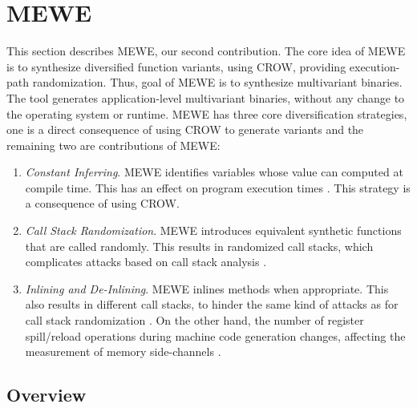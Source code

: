 \section{MEWE}
\label{section:mewe}

\newcommand{\tool}{MEWE\xspace}
\newcommand{\repourl}{TODO}
This section describes MEWE, our second contribution. 
The core idea of \tool is to synthesize diversified function variants, using CROW, providing execution-path randomization. Thus, goal of \tool is to synthesize multivariant  \wasm binaries. %
The tool generates application-level multivariant binaries, without any change to the operating system or \wasm runtime.
MEWE has three core diversification strategies, one is a direct consequence of using CROW to generate variants and the remaining two are contributions of MEWE:
\begin{enumerate}
    \item \emph{Constant Inferring}. \tool identifies variables whose value can computed at compile time. This has an effect on program execution times \cite{brennan2020jit}. This strategy is a consequence of using CROW.

    \item \emph{Call Stack Randomization}. \tool introduces equivalent synthetic functions that are called randomly. This results in randomized call stacks, which complicates attacks based on call stack analysis \cite{liljestrand2021pacstack}. 

    \item \emph{Inlining and De-Inlining}. \tool inlines methods when appropriate. This also results in different call stacks, to hinder the same kind of attacks as for call stack randomization \cite{liljestrand2021pacstack}. On the other hand, the number of register spill/reload operations during machine code generation changes, affecting the measurement of memory side-channels \cite{rane2015raccoon}. 
    

\end{enumerate}

\subsection*{Overview}

